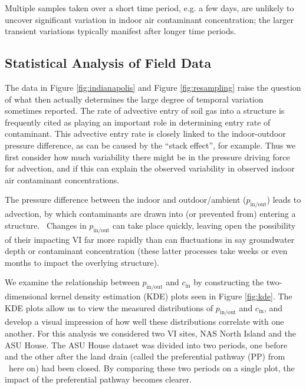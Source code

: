 Multiple samples taken over a short time period, e.g. a few days, are unlikely to uncover significant variation in indoor air contaminant concentration; the larger transient variations typically manifest after longer time periods. \par

\subsection{Statistical Analysis of Field Data}\label{s:results_pressure_concentration}

The data in Figure \ref{fig:indianapolis} and Figure \ref{fig:resampling} raise the question of what then actually determines the large degree of temporal variation sometimes reported.
The rate of advective entry of soil gas into a structure is frequently cited as playing an important role in determining entry rate of contaminant.
This advective entry rate is closely linked to the indoor-outdoor pressure difference, as can be caused by the “stack effect”, for example.
Thus we first consider how much variability there might be in the pressure driving force for advection, and if this can explain the observed variability in observed indoor air contaminant concentrations.\par

The pressure difference between the indoor and outdoor/ambient ($p_\mathrm{in/out}$) leads to advection, by which contaminants are drawn into (or prevented from) entering a structure. 
Changes in $p_\mathrm{in/out}$ can take place quickly, leaving open the possibility of their impacting VI far more rapidly than can fluctuations in say groundwater depth or contaminant concentration (these latter processes take weeks or even months to impact the overlying structure).\par

We examine the relationship between $p_\mathrm{in/out}$ and $c_\mathrm{in}$ by constructing the two-dimensional kernel density estimation (KDE) plots seen in Figure \ref{fig:kde}.
The KDE plots allow us to view the measured distributions of $p_\mathrm{in/out}$ and $c_\mathrm{in}$, and develop a visual impression of how well these distributions correlate with one another.
For this analysis we considered two VI sites, NAS North Island and the ASU House.
The ASU House dataset was divided into two periods, one before and the other after the land drain (called the preferential pathway (PP) from  here on) had been closed.
By comparing these two periods on a single plot, the impact of the preferential pathway becomes clearer.\par

